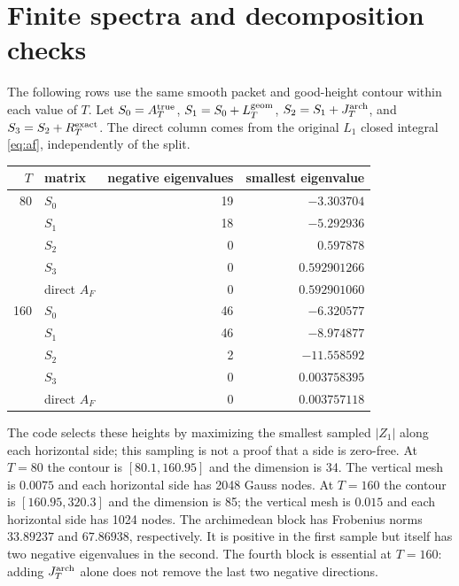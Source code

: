 \documentclass[11pt]{article}
\begin{document}
\section{Finite spectra and decomposition checks}

The following rows use the same smooth packet and good-height contour within
each value of $T$. Let $S_0=A_T^{\rm true}$,
$S_1=S_0+L_T^{\rm geom}$, $S_2=S_1+J_T^{\rm arch}$, and
$S_3=S_2+R_T^{\rm exact}$. The direct column comes from the original
$L_1$ closed integral \eqref{eq:af}, independently of the split.

\begin{center}
\begin{tabular}{@{}r l r r@{}}
\toprule
$T$ & matrix & negative eigenvalues & smallest eigenvalue \\
\midrule
80 & $S_0$ & 19 & $-3.303704$ \\
   & $S_1$ & 18 & $-5.292936$ \\
   & $S_2$ & 0  & $\phantom{-}0.597878$ \\
   & $S_3$ & 0  & $\phantom{-}0.592901266$ \\
   & direct $A_F$ & 0 & $\phantom{-}0.592901060$ \\
\midrule
160 & $S_0$ & 46 & $-6.320577$ \\
    & $S_1$ & 46 & $-8.974877$ \\
    & $S_2$ & 2  & $-11.558592$ \\
    & $S_3$ & 0  & $\phantom{-}0.003758395$ \\
    & direct $A_F$ & 0 & $\phantom{-}0.003757118$ \\
\bottomrule
\end{tabular}
\end{center}

The code selects these heights by maximizing the smallest sampled $|Z_1|$
along each horizontal side; this sampling is not a proof that a side is
zero-free. At $T=80$ the contour is $[80.1,160.95]$ and the dimension is 34. The
vertical mesh is $0.0075$ and each horizontal side has 2048 Gauss nodes.
At $T=160$ the contour is $[160.95,320.3]$ and the dimension is 85; the
vertical mesh is $0.015$ and each horizontal side has 1024 nodes. The
archimedean block has Frobenius norms $33.89237$ and $67.86938$, respectively.
It is positive in the first sample but itself has two negative eigenvalues
in the second. The fourth block is essential at $T=160$: adding $J_T^{\rm arch}$
alone does not remove the last two negative directions.
\end{document}
